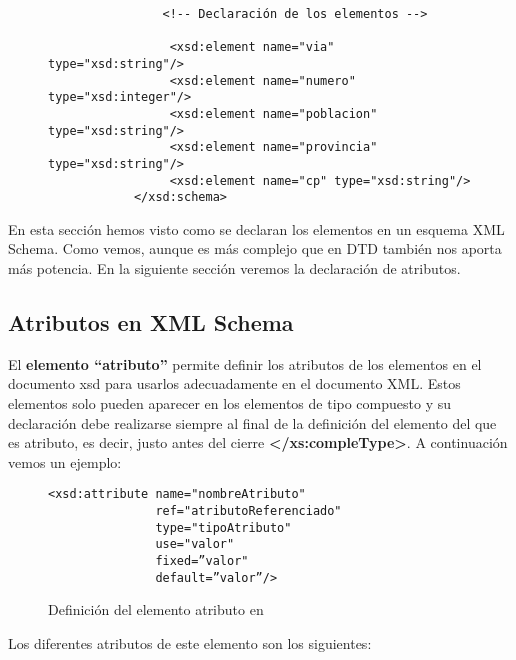 \begin{itemize}
\begin{itemize}
\begin{itemize}
\begin{figure}[h]
\begin{tcolorbox}[sharp corners, colback=yellow!30, colframe=white!20]
\begin{verbatim}
                <!-- Declaración de los elementos -->

                 <xsd:element name="via" type="xsd:string"/>
                 <xsd:element name="numero" type="xsd:integer"/>
                 <xsd:element name="poblacion" type="xsd:string"/>
                 <xsd:element name="provincia" type="xsd:string"/>
                 <xsd:element name="cp" type="xsd:string"/>
            </xsd:schema>
                \end{verbatim}
            \end{tcolorbox}
        \end{figure}
        \end{itemize}
    \end{itemize}
\end{itemize}

En esta sección hemos visto como se declaran los elementos en un esquema XML Schema. Como vemos, aunque es más complejo que en DTD también nos aporta más potencia. En la siguiente sección veremos la declaración de atributos.

\subsection{Atributos en XML Schema}
El \textbf{elemento ``atributo''} permite definir los atributos de los elementos en el documento xsd para usarlos adecuadamente en el documento XML. Estos elementos solo pueden aparecer en los elementos de tipo compuesto y su declaración debe realizarse siempre al final de la definición del elemento del que es atributo, es decir, justo antes del cierre \textbf{</xs:compleType>}. A continuación vemos un ejemplo:

\begin{figure}[H]
    \begin{tcolorbox}[sharp corners, colback=yellow!30, colframe=white!20]
        \scriptsize
        \begin{verbatim}
<xsd:attribute name="nombreAtributo"
               ref="atributoReferenciado"
               type="tipoAtributo"
               use="valor"
               fixed=”valor"
               default=”valor”/>
        \end{verbatim}
    \end{tcolorbox}
    \caption{Definición del elemento atributo en }
\end{figure}

Los diferentes atributos de este elemento son los siguientes:

